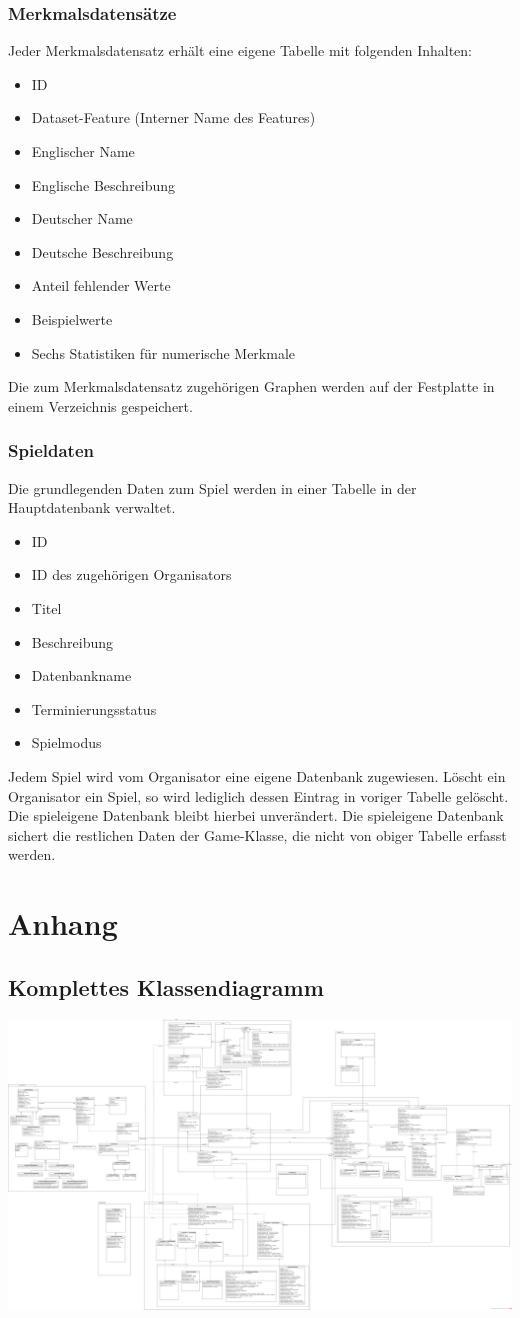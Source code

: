 \documentclass[a4paper]{scrreprt}
\begin{document}
    \subsection{Merkmalsdatensätze}
    Jeder Merkmalsdatensatz erhält eine eigene Tabelle mit folgenden Inhalten:
    \begin{itemize}
        \item ID
        \item Dataset-Feature (Interner Name des Features)
        \item Englischer Name
        \item Englische Beschreibung
        \item Deutscher Name
        \item Deutsche Beschreibung
        \item Anteil fehlender Werte
        \item Beispielwerte
        \item Sechs Statistiken für numerische Merkmale
    \end{itemize}
    Die zum Merkmalsdatensatz zugehörigen Graphen werden auf der Festplatte in einem Verzeichnis gespeichert.
    \subsection{Spieldaten}
    Die grundlegenden Daten zum Spiel werden in einer Tabelle in der Hauptdatenbank verwaltet.
    \begin{itemize}
        \item ID
        \item ID des zugehörigen Organisators
        \item Titel
        \item Beschreibung
        \item Datenbankname
        \item Terminierungsstatus
        \item Spielmodus
    \end{itemize}
    Jedem Spiel wird vom Organisator eine eigene Datenbank zugewiesen.
    Löscht ein Organisator ein Spiel, so wird lediglich dessen Eintrag in voriger Tabelle gelöscht.
    Die spieleigene Datenbank bleibt hierbei unverändert.
    Die spieleigene Datenbank sichert die restlichen Daten der Game-Klasse, die nicht von obiger Tabelle erfasst werden.


    \chapter{Anhang}
    \section{Komplettes Klassendiagramm}
    \includegraphics[width=\textwidth]{img/komplett.pdf}
\end{document}
